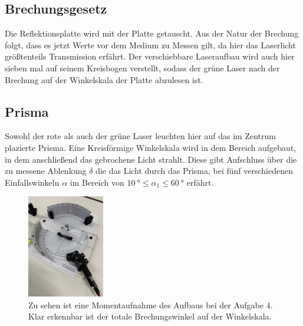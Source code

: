 \subsection{Brechungsgesetz}
Die Reflektionsplatte wird mit der Platte getauscht. Aus der Natur der Brechung folgt, dass es jetzt Werte 
vor dem Medium zu Messen gilt, da hier das Laserlicht größtenteils Transmission erfährt.
Der verschiebbare Laseraufbau wird auch hier sieben mal auf seinem Kreisbogen verstellt, sodass der grüne Laser 
nach der Brechung auf der Winkelskala der Platte abzulesen ist. 

\subsection{Prisma}

Sowohl der rote als auch der grüne Laser leuchten hier auf das im Zentrum plazierte Prisma.
Eine Kreisförmige Winkelskala wird in dem Bereich aufgebaut, in dem anschließend das gebrochene Licht strahlt. Diese gibt Aufschluss
über die zu messene Ablenkung $\delta$ die das Licht durch das Prisma, bei fünf verschiedenen Einfallswinkeln $\alpha$ im Bereich von 
$\SI{10}{\degree} \leq \alpha_1 \leq \SI{60}{\degree}$ erfährt.
    \begin{figure}
        \centering
        \includegraphics[width=0.3\textwidth]{bilder/prisma.jpg}
        \caption{Zu sehen ist eine Momentaufnahme des Aufbaus bei der Aufgabe 4. \cite{skript} 
        Klar erkennbar ist der totale Brechungswinkel auf der Winkelskala.}
\end{figure}
\newpage
